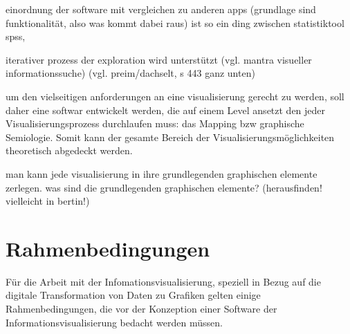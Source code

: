 \documentclass[a4paper, 12pt, DIVcalc, onepage, pdftex, headsepline, footsepline]{scrreprt}
\begin{document}
einordnung der software mit vergleichen zu anderen apps (grundlage sind funktionalität, also was kommt dabei raus) ist so ein ding zwischen statistiktool spss, 

iterativer prozess der exploration wird unterstützt (vgl. mantra visueller informationssuche) (vgl. preim/dachselt, s 443 ganz unten)

um den vielseitigen anforderungen an eine visualisierung gerecht zu werden, soll daher eine softwar entwickelt werden, die auf einem Level ansetzt den jeder Visualisierungsprozess durchlaufen muss: das Mapping bzw graphische Semiologie. Somit kann der gesamte Bereich der Visualisierungsmöglichkeiten theoretisch abgedeckt werden.

man kann jede visualisierung in ihre grundlegenden graphischen elemente zerlegen.
was sind die grundlegenden graphischen elemente? (herausfinden! vielleicht in bertin!)

\section{Rahmenbedingungen}
Für die Arbeit mit der Infomationsvisualisierung, speziell in Bezug auf die digitale
Transformation von Daten zu Grafiken gelten einige Rahmenbedingungen, die vor der
Konzeption einer Software der Informationsvisualisierung bedacht werden müssen.
\end{document}

